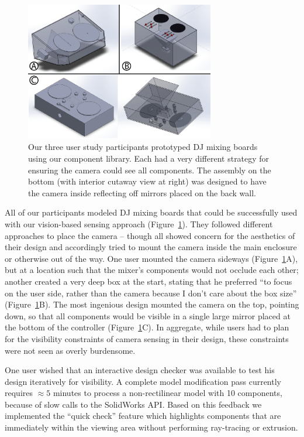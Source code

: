     \begin{figure}
\centering
\includegraphics[width=3.25in]{figures/sauron/study.png}
\caption{Our three user study participants prototyped DJ mixing boards using our component library.  Each had a very different strategy for ensuring the camera could see all components.  The assembly on the bottom (with interior cutaway view at right) was designed to have the camera inside reflecting off mirrors placed on the back wall.}
\label{fig:sauron-study}
\end{figure}

    All of our participants modeled DJ mixing boards that could be successfully used with our vision-based sensing approach (Figure~\ref{fig:sauron-study}). They followed different approaches to place the camera -- though all showed concern for the aesthetics of their design and accordingly tried to mount the camera inside the main enclosure or otherwise out of the way. One user mounted the camera sideways (Figure~\ref{fig:sauron-study}A), but at a location such that the mixer's components would not occlude each other; another created a very deep box at the start, stating that he preferred ``to focus on the user side, rather than the camera because I don't care about the box size'' (Figure~\ref{fig:sauron-study}B). The most ingenious design mounted the camera on the top, pointing down, so that all components would be visible in a single large mirror placed at the bottom of the controller (Figure~\ref{fig:sauron-study}C). In aggregate, while users had to plan for the visibility constraints of camera sensing in their design, these constraints were not seen as overly burdensome.

    One user wished that an interactive design checker was available to test his design iteratively for visibility. A complete model modification pass currently requires $\approx 5$ minutes to process a non-rectilinear model with 10 components, because of slow calls to the SolidWorks API. Based on this feedback we implemented the ``quick check'' feature which highlights components that are immediately within the viewing area without performing ray-tracing or extrusion.

